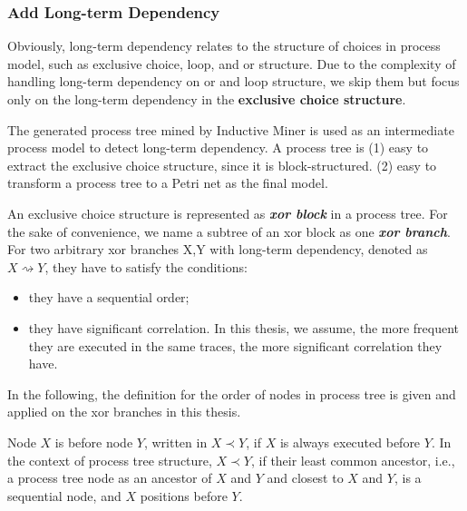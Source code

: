 \subsubsection{Add Long-term Dependency}
Obviously, long-term dependency relates to the structure of choices in process model, such as exclusive choice, loop, and or structure. Due to the complexity of handling long-term dependency on or and loop structure, we skip them but focus only on the long-term dependency in the \textbf{exclusive choice structure}. 

The generated process tree mined by Inductive Miner is used as an intermediate process model to detect long-term dependency.  A process tree is  (1) easy to extract the exclusive choice structure, since it is block-structured. (2) easy to transform a process tree to a Petri net as the final model.

An exclusive choice structure is represented as \textbf{\emph{xor block}} in a process tree. For the sake of convenience, we name a subtree of an xor block as one \textbf{\emph{xor branch}}. %
For two arbitrary xor branches X,Y with long-term dependency, denoted as $ X\rightsquigarrow Y$, they have to satisfy the conditions: 
\begin{itemize}
	\item they have a sequential order;
	\item they have significant correlation. In this thesis, we assume, the more frequent they are executed in the same traces, the more significant correlation they have.
\end{itemize} 
In the following, the definition for the order of nodes in process tree is given and applied on the xor branches in this thesis.
\begin{definition}
	Node $X$ is before node $Y$, written in $X \prec Y$, if $X$ is always executed before $Y$.  In the context of process tree structure, $X \prec Y$, if their least common ancestor, i.e., a process tree node as an ancestor of $X$ and $Y$ and closest to $X$ and $Y$, is a sequential node, and $X$ positions before $Y$.
\end{definition} 

